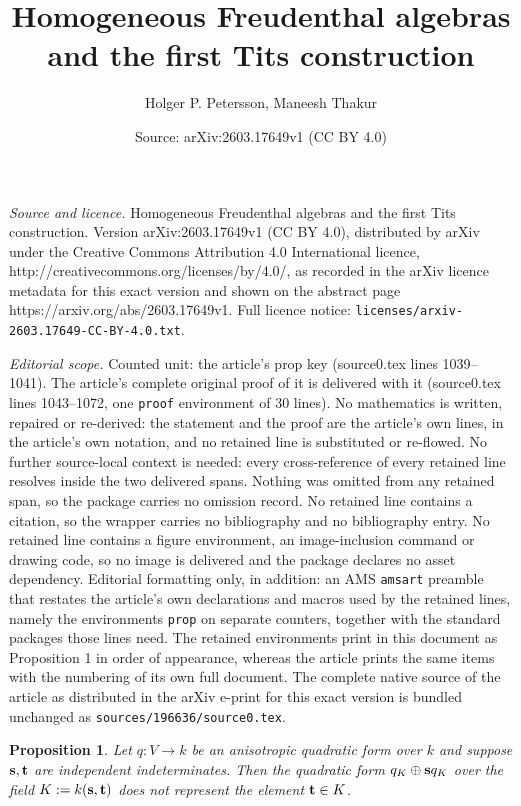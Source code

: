 \documentclass[10pt,a4paper]{amsart}
\title{Homogeneous Freudenthal algebras and the first Tits construction}
\author{Holger P. Petersson, Maneesh Thakur}
\date{Source: arXiv:2603.17649v1 (CC BY 4.0)}
\newtheorem{prop}{Proposition}
\begin{document}
\maketitle

\noindent\emph{Source and licence.} Homogeneous Freudenthal algebras and the first Tits construction. Version arXiv:2603.17649v1 (CC BY 4.0), distributed by arXiv under the Creative Commons Attribution 4.0 International licence, http://creativecommons.org/licenses/by/4.0/, as recorded in the arXiv licence metadata for this exact version and shown on the abstract page https://arxiv.org/abs/2603.17649v1. Full licence notice: \texttt{licenses/arxiv-2603.17649-CC-BY-4.0.txt}.\par\smallskip

\noindent\textit{Editorial scope.} Counted unit: the article's prop key (source0.tex lines 1039--1041). The article's complete original proof of it is delivered with it (source0.tex lines 1043--1072, one \texttt{proof} environment of 30 lines). No mathematics is written, repaired or re-derived: the statement and the proof are the article's own lines, in the article's own notation, and no retained line is substituted or re-flowed.  No further source-local context is needed: every cross-reference of every retained line resolves inside the two delivered spans.  Nothing was omitted from any retained span, so the package carries no omission record.  No retained line contains a citation, so the wrapper carries no bibliography and no bibliography entry.  No retained line contains a figure environment, an image-inclusion command or drawing code, so no image is delivered and the package declares no asset dependency.  Editorial formatting only, in addition: an AMS \texttt{amsart} preamble that restates the article's own declarations and macros used by the retained lines, namely the environments \texttt{prop} on separate counters, together with the standard packages those lines need.  The retained environments print in this document as Proposition 1 in order of appearance, whereas the article prints the same items with the numbering of its own full document.  The complete native source of the article as distributed in the arXiv e-print for this exact version is bundled unchanged as \texttt{sources/196636/source0.tex}.
\begin{prop}\label{key}
	Let $q:V \to k$ be an anisotropic quadratic form over $k$ and suppose ${\bf s},{\bf t}$	are independent indeterminates. Then the quadratic form $q_K \oplus {\bf s} q_K$ over the field $K := k({\bf s},{\bf t})$ does not represent the element ${\bf t} \in K$.
\end{prop}
\end{document}
